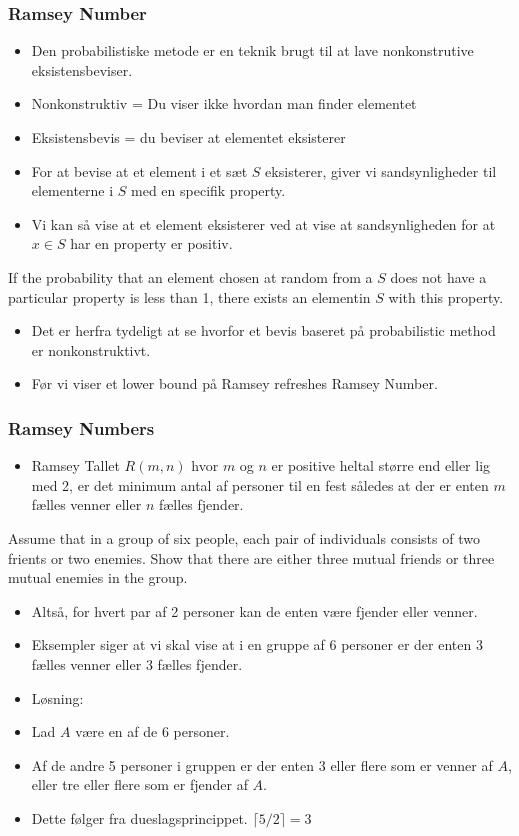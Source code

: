 \documentclass{beamer}
\begin{document}
\begin{frame}[allowframebreaks]
  \frametitle{Ramsey Number}
  \begin{itemize}
  \item Den probabilistiske metode er en teknik brugt til at lave nonkonstrutive eksistensbeviser.
  \item Nonkonstruktiv = Du viser ikke hvordan man finder elementet 
  \item Eksistensbevis = du beviser at elementet eksisterer
  \item For at bevise at et element i et sæt $S$  eksisterer, giver vi sandsynligheder til elementerne i $S$ med en specifik property. 
  \item Vi kan så vise at et element eksisterer ved at vise at sandsynligheden for at $x \in S$ har en property er positiv. 
\end{itemize}
\begin{theorem}
If the probability that an element chosen at random from a $S$ does not have a particular property is less than 1, there exists an elementin $S$ with this property.
\end{theorem}
\begin{itemize}
\item Det er herfra tydeligt at se hvorfor et bevis baseret på probabilistic method er nonkonstruktivt.
\item Før vi viser et lower bound på Ramsey refreshes Ramsey Number.
\end{itemize}
\end{frame}

\begin{frame}[allowframebreaks]
  \frametitle{Ramsey Numbers}
  \begin{itemize}
  \item Ramsey Tallet $R(m,n)$ hvor $m$ og $n$ er positive heltal større end eller lig med 2, er det minimum antal af personer til en fest således at der er enten $m$ fælles venner eller $n$ fælles fjender. 
  \end{itemize}
  \begin{example}[13]
Assume that in a group of six people, each pair of individuals consists of two frients or two enemies. Show that there are either three mutual friends or three mutual enemies in the group. 
\end{example}
\begin{itemize}
\item Altså, for hvert par af 2 personer kan de enten være fjender eller venner. 
\item Eksempler siger at vi skal vise at i en gruppe af 6 personer er der enten 3 fælles venner eller 3 fælles fjender. 
\item Løsning:
\item Lad $A$ være en af de 6 personer. 
\item Af de andre 5 personer i gruppen er der enten 3 eller flere som er venner af $A$, eller tre eller flere som er fjender af $A$. 
\item Dette følger fra dueslagsprincippet. $\lceil 5/2 \rceil = 3$
\end{itemize}
\end{frame}
\end{document}

